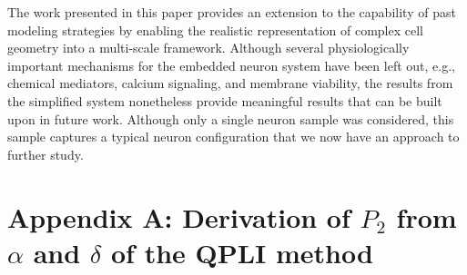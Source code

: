 \documentclass[]{interact}
\newcommand{\red}[1]{\textcolor{red}{[#1]}}
\begin{document}
The work presented in this paper provides an extension to the capability of past modeling strategies by enabling the realistic representation of complex cell geometry into a multi-scale framework. Although several physiologically important mechanisms for the embedded neuron system have been left out, e.g., chemical mediators, calcium signaling, and membrane viability, the results from the simplified system nonetheless provide meaningful results that can be built upon in future work. Although only a single neuron sample was considered, this sample captures a typical neuron configuration that we now have an approach to further study.  


%
\newpage





\appendix
\section*{Appendix A: Derivation of $P_2$ from $\alpha$ and $\delta$ of the QPLI method}
\label{app:P2_derivation}
\end{document}
